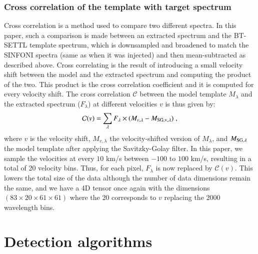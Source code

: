 \documentclass{aa}
\begin{document}
\subsubsection{Cross correlation of the template with target spectrum}\label{sec: CC algorithm}

Cross correlation is a method used to compare two different spectra.
In this paper, such a comparison is made between an extracted spectrum and the BT-SETTL template spectrum, which is downsampled and broadened to match the SINFONI spectra (same as when it was injected) and then mean-subtracted as described above.
Cross correlating is the result of introducing a small velocity shift between the model and the extracted spectrum and computing the product of the two.
This product is the cross correlation coefficient and it is computed for every velocity shift.
The cross correlation $\mathcal{C}$ between the model template $M_{\lambda}$ and the extracted spectrum ($F_{\lambda}$) at different velocities $v$ is thus given by:
\begin{equation}
    \mathcal{C}(v) = \sum\limits_{\lambda}F_{\rm{\lambda}}\times (M_{v,\lambda}-M_{\rm{SG},v,\lambda})  \; ,
    \label{eq:CC equation}
\end{equation}
where $v$ is the velocity shift, $M_{v,\lambda}$ the velocity-shifted version of $M_{\lambda}$, and $M_{\rm{SG},\lambda}$ the model template after applying the Savitzky-Golay filter.
In this paper, we sample the velocities at every $10$ km/s between $-100$ to $100$ km/s, resulting in a total of 20 velocity bins. Thus, for each pixel, $F_\lambda$ is now replaced by $\mathcal{C}(v)$. This lowers the total size of the data although the number of data dimensions remain the same, and we have a 4D tensor once again with the dimensions $\left(83\times20\times61\times61\right)$ where the 20 corresponds to $v$ replacing the 2000 wavelength bins.



\section{Detection algorithms}
\label{sec:mapbased}
\end{document}
